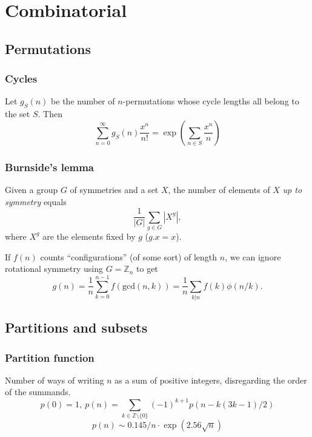 \chapter{Combinatorial}

\section{Permutations}

	\subsection{Cycles}
		Let $g_S(n)$ be the number of $n$-permutations whose cycle lengths all belong to the set $S$. Then
		$$\sum_{n=0} ^\infty g_S(n) \frac{x^n}{n!} = \exp\left(\sum_{n\in S} \frac{x^n} {n} \right)$$


	\subsection{Burnside's lemma} %
		Given a group $G$ of symmetries and a set $X$, the number of elements of $X$ \emph{up to symmetry} equals
		 \[ {\frac {1}{|G|}}\sum _{{g\in G}}|X^{g}|, \]
		 where $X^{g}$ are the elements fixed by $g$ ($g.x = x$).

		 If $f(n)$ counts ``configurations'' (of some sort) of length $n$, we can ignore rotational symmetry using $G = \mathbb Z_n$ to get
		 \[ g(n) = \frac 1 n \sum_{k=0}^{n-1}{f(\text{gcd}(n, k))} = \frac 1 n \sum_{k|n}{f(k)\phi(n/k)}. \]


\section{Partitions and subsets}
	\subsection{Partition function}
		Number of ways of writing $n$ as a sum of positive integers, disregarding the order of the summands.
		\[ p(0) = 1,\ p(n) = \sum_{k \in \mathbb Z \setminus \{0\}}{(-1)^{k+1} p(n - k(3k-1) / 2)} \]
		\[ p(n) \sim 0.145 / n \cdot \exp(2.56 \sqrt{n}) \]

